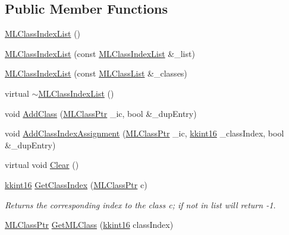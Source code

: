 \subsection*{Public Member Functions}
\begin{DoxyCompactItemize}
\item 
\hyperlink{class_k_k_m_l_l_1_1_m_l_class_index_list_a75f5662aa94a808d6668bdd5b250ad9a}{M\+L\+Class\+Index\+List} ()
\item 
\hyperlink{class_k_k_m_l_l_1_1_m_l_class_index_list_a8e9ad3d48dbe298f7da3a9c4cbd93160}{M\+L\+Class\+Index\+List} (const \hyperlink{class_k_k_m_l_l_1_1_m_l_class_index_list}{M\+L\+Class\+Index\+List} \&\+\_\+list)
\item 
\hyperlink{class_k_k_m_l_l_1_1_m_l_class_index_list_a8063b23d23ca62f3c149dfce3aad556c}{M\+L\+Class\+Index\+List} (const \hyperlink{class_k_k_m_l_l_1_1_m_l_class_list}{M\+L\+Class\+List} \&\+\_\+classes)
\item 
virtual \hyperlink{class_k_k_m_l_l_1_1_m_l_class_index_list_a4c9df6a3056a58023862a52b5d24a89a}{$\sim$\+M\+L\+Class\+Index\+List} ()
\item 
void \hyperlink{class_k_k_m_l_l_1_1_m_l_class_index_list_aee281aacdbf355482579a46563be9c8e}{Add\+Class} (\hyperlink{namespace_k_k_m_l_l_ac272393853d59e72e8456f14cd6d8c23}{M\+L\+Class\+Ptr} \+\_\+ic, bool \&\+\_\+dup\+Entry)
\item 
void \hyperlink{class_k_k_m_l_l_1_1_m_l_class_index_list_a203e6905f4f979916bc04ba18e2480df}{Add\+Class\+Index\+Assignment} (\hyperlink{namespace_k_k_m_l_l_ac272393853d59e72e8456f14cd6d8c23}{M\+L\+Class\+Ptr} \+\_\+ic, \hyperlink{namespace_k_k_b_a93809780ee294124dda4c23069f41248}{kkint16} \+\_\+class\+Index, bool \&\+\_\+dup\+Entry)
\item 
virtual void \hyperlink{class_k_k_m_l_l_1_1_m_l_class_index_list_a6708769cb9c2e8773580c1247f1dcdc5}{Clear} ()
\item 
\hyperlink{namespace_k_k_b_a93809780ee294124dda4c23069f41248}{kkint16} \hyperlink{class_k_k_m_l_l_1_1_m_l_class_index_list_a9fadd1a6477ef0decfe0ff6b5db9daed}{Get\+Class\+Index} (\hyperlink{namespace_k_k_m_l_l_ac272393853d59e72e8456f14cd6d8c23}{M\+L\+Class\+Ptr} c)
\begin{DoxyCompactList}\small\item\em Returns the corresponding index to the class \textquotesingle{}c\textquotesingle{}; if not in list will return -\/1. \end{DoxyCompactList}\item 
\hyperlink{namespace_k_k_m_l_l_ac272393853d59e72e8456f14cd6d8c23}{M\+L\+Class\+Ptr} \hyperlink{class_k_k_m_l_l_1_1_m_l_class_index_list_af8d2827c2ea25d27a74edc1715aadca5}{Get\+M\+L\+Class} (\hyperlink{namespace_k_k_b_a93809780ee294124dda4c23069f41248}{kkint16} class\+Index)

\end{DoxyCompactItemize}
